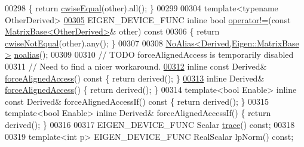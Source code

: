 \begin{DoxyCode}
00298 \textcolor{keyword}{    }\{ \textcolor{keywordflow}{return} \hyperlink{group___core___module_a1d63c6dd2c0c6c8186fdabdf55ee1f58}{cwiseEqual}(other).all(); \}
00299 
00304     \textcolor{keyword}{template}<\textcolor{keyword}{typename} OtherDerived>
\hyperlink{group___core___module_a932a37b58d2bad69849a3a8809aaffac}{00305}     EIGEN\_DEVICE\_FUNC \textcolor{keyword}{inline} \textcolor{keywordtype}{bool} \hyperlink{group___core___module_a932a37b58d2bad69849a3a8809aaffac}{operator!=}(\textcolor{keyword}{const} 
      \hyperlink{group___core___module_class_eigen_1_1_matrix_base}{MatrixBase<OtherDerived>}& other)\textcolor{keyword}{ const}
00306 \textcolor{keyword}{    }\{ \textcolor{keywordflow}{return} \hyperlink{group___core___module_a78d22ea009bdb12a0988a1c2cb5252b2}{cwiseNotEqual}(other).any(); \}
00307 
00308     \hyperlink{group___core___module_class_eigen_1_1_no_alias}{NoAlias<Derived,Eigen::MatrixBase >} 
      \hyperlink{group___core___module_a2c1085de7645f23f240876388457da0b}{noalias}();
00309 
00310     \textcolor{comment}{// TODO forceAlignedAccess is temporarily disabled}
00311     \textcolor{comment}{// Need to find a nicer workaround.}
\hyperlink{group___core___module_ad2fdb842d9a715f8778d0b33c29cfe49}{00312}     \textcolor{keyword}{inline} \textcolor{keyword}{const} Derived& \hyperlink{group___core___module_ad2fdb842d9a715f8778d0b33c29cfe49}{forceAlignedAccess}()\textcolor{keyword}{ const }\{ \textcolor{keywordflow}{return} derived(); \}
\hyperlink{group___core___module_afdaf810ac1708ca6d6ecdcfac1e06699}{00313}     \textcolor{keyword}{inline} Derived& \hyperlink{group___core___module_afdaf810ac1708ca6d6ecdcfac1e06699}{forceAlignedAccess}() \{ \textcolor{keywordflow}{return} derived(); \}
00314     \textcolor{keyword}{template}<\textcolor{keywordtype}{bool} Enable> \textcolor{keyword}{inline} \textcolor{keyword}{const} Derived& forceAlignedAccessIf()\textcolor{keyword}{ const }\{ \textcolor{keywordflow}{return} derived(); \}
00315     \textcolor{keyword}{template}<\textcolor{keywordtype}{bool} Enable> \textcolor{keyword}{inline} Derived& forceAlignedAccessIf() \{ \textcolor{keywordflow}{return} derived(); \}
00316 
00317     EIGEN\_DEVICE\_FUNC Scalar \hyperlink{group___core___module_a2cc7a95b161f3a660bdb8ff048b44161}{trace}() \textcolor{keyword}{const};
00318 
00319     \textcolor{keyword}{template}<\textcolor{keywordtype}{int} p> EIGEN\_DEVICE\_FUNC RealScalar lpNorm() \textcolor{keyword}{const};

\end{DoxyCode}
